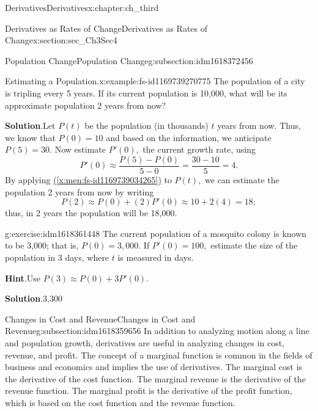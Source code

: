 \documentclass[oneside,10pt,]{book}
\newcommand{\blocktitlefont}{\relax}
\newcommand{\xreffont}{\relax}
\numberwithin{equation}{section}
\begin{document}
\begin{chapterptx}{Derivatives}{}{Derivatives}{}{}{x:chapter:ch_third}
\begin{sectionptx}{Derivatives as Rates of Change}{}{Derivatives as Rates of Change}{}{}{x:section:sec_Ch3Sec4}
\begin{subsectionptx}{Population Change}{}{Population Change}{}{}{g:subsection:idm1618372456}
\begin{example}{Estimating a Population.}{x:example:fs-id1169739270775}
The population of a city is tripling every 5 years. If its current population is 10,000, what will be its approximate population 2 years from now?%
\par\smallskip%
\noindent\textbf{\blocktitlefont Solution}.\hypertarget{g:solution:idm1618368360}{}\quad{}Let \(P(t)\) be the population (in thousands) \(t\) years from now. Thus, we know that \(P(0)=10\) and based on the information, we anticipate \(P(5)=30.\) Now estimate \(P'(0),\) the current growth rate, using%
%
\begin{equation*}
P'(0)\approx \frac{P(5)-P(0)}{5-0}=\frac{30-10}{5}=4.
\end{equation*}
By applying \hyperref[x:men:fs-id1169739034265]{({\xreffont\ref{x:men:fs-id1169739034265}})} to \(P(t),\) we can estimate the population 2 years from now by writing%
%
\begin{equation*}
P(2)\approx P(0)+(2)P'(0)\approx 10+2(4)=18;
\end{equation*}
thus, in 2 years the population will be 18,000.%
\end{example}
\begin{inlineexercise}{}{g:exercise:idm1618361448}%
The current population of a mosquito colony is known to be 3,000; that is, \(P(0)=3,000.\) If \(P'(0)=100,\) estimate the size of the population in 3 days, where \(t\) is measured in days.%
\par\smallskip%
\noindent\textbf{\blocktitlefont Hint}.\hypertarget{g:hint:idm1618357480}{}\quad{}Use \(P(3)\approx P(0)+3P'(0).\)%
\par\smallskip%
\noindent\textbf{\blocktitlefont Solution}.\hypertarget{g:solution:idm1618357608}{}\quad{}3,300%
\end{inlineexercise}%
\end{subsectionptx}
%
%
\typeout{************************************************}
\typeout{************************************************}
%
\begin{subsectionptx}{Changes in Cost and Revenue}{}{Changes in Cost and Revenue}{}{}{g:subsection:idm1618359656}
In addition to analyzing motion along a line and population growth, derivatives are useful in analyzing changes in cost, revenue, and profit. The concept of a marginal function is common in the fields of business and economics and implies the use of derivatives. The marginal cost is the derivative of the cost function. The marginal revenue is the derivative of the revenue function. The marginal profit is the derivative of the profit function, which is based on the cost function and the revenue function.%

\end{subsectionptx}
\end{sectionptx}
\end{chapterptx}
\end{document}
